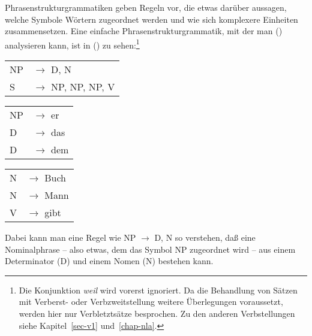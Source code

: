 Phrasenstrukturgrammatiken geben Regeln vor, die etwas darüber aussagen, welche Symbole Wörtern
zugeordnet werden und wie sich komplexere Einheiten zusammensetzen. Eine einfache Phrasenstrukturgrammatik,
mit der man () analysieren kann, ist in () zu sehen:\footnote{
  Die Konjunktion \emph{weil} wird vorerst ignoriert. Da die Behandlung von Sätzen mit Verberst- oder
  Verbzweitstellung weitere Überlegungen voraussetzt, werden hier nur Verbletztsätze besprochen.
  Zu den anderen Verbstellungen siehe Kapitel~\ref{sec-v1} und~\ref{chap-nla}.%
}
\ea
\label{bsp-grammatik-psg}
\begin{tabular}[t]{@{}l@{ }l}
{NP} & {$\to$ D, N}\\          
{S}  & {$\to$ NP, NP, NP, V}
\end{tabular}\hspace{2cm}%
\begin{tabular}[t]{@{}l@{ }l}
{NP} & {$\to$ er}\\
{D}  & {$\to$ das}\\
{D}  & {$\to$ dem}\\
\end{tabular}\hspace{8mm}
\begin{tabular}[t]{@{}l@{ }l}
{N} & {$\to$ Buch}\\
{N} & {$\to$ Mann}\\
{V} & {$\to$ gibt}\\
\end{tabular}
\z
Dabei kann man eine Regel wie NP $\to$\is{$\to$} D, N so verstehen, daß eine Nominalphrase -- also etwas,
dem das Symbol NP zugeordnet wird -- aus einem Determinator (D) und einem Nomen (N) bestehen kann.

